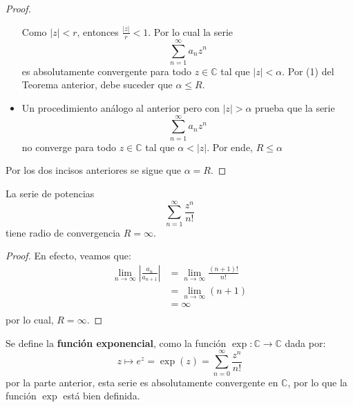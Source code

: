 \documentclass[12pt]{report}
\theoremstyle{largebreak}
\newcommand\abs[1]{\ensuremath{\left|#1\right|}}
\newcommand\cf[3]{\ensuremath{#1:#2\rightarrow#3}}
\begin{document}
\begin{proof}
\begin{itemize}
\begin{equation*}
            \end{equation*}
            Como $\abs{z}<r$, entonces $\frac{\abs{z}}{r}<1$. Por lo cual la serie
            \begin{equation*}
                \sum_{ n=1}^\infty a_nz^n
            \end{equation*}
            es absolutamente convergente para todo $z\in\mathbb{C}$ tal que $\abs{z}<\alpha$. Por (1) del Teorema anterior, debe suceder que $\alpha\leq R$.
            \item Un procedimiento análogo al anterior pero con $\abs{z}>\alpha$ prueba que la serie
            \begin{equation*}
                \sum_{ n=1}^\infty a_nz^n
            \end{equation*}
            no converge para todo $z\in\mathbb{C}$ tal que $\alpha<\abs{z}$. Por ende, $R\leq \alpha$
        \end{itemize}
        Por los dos incisos anteriores se sigue que $\alpha=R$.
    \end{proof}

    \begin{exa}
        La serie de potencias
        \begin{equation*}
            \sum_{ n=1}^\infty\frac{z^n}{n!}
        \end{equation*}
        tiene radio de convergencia $R=\infty$.
    \end{exa}

    \begin{proof}
        En efecto, veamos que:
        \begin{equation*}
            \begin{split}
                \lim_{n\rightarrow\infty}\abs{\frac{a_{ n}}{a_{n+1}}}&=\lim_{n\rightarrow\infty}\frac{(n+1)!}{n!}\\
                &=\lim_{n\rightarrow\infty}(n+1)\\
                &=\infty\\
            \end{split}
        \end{equation*}
        por lo cual, $R=\infty$.
    \end{proof}

    \begin{mydef}
        Se define la \textbf{función exponencial}, como la función $\cf{\exp}{\mathbb{C}}{\mathbb{C}}$ dada por:
        \begin{equation*}
            z\mapsto e^z=\exp(z)=\sum_{ n=0}^\infty\frac{z^n}{n!}
        \end{equation*}
        por la parte anterior, esta serie es absolutamente convergente en $\mathbb{C}$, por lo que la función $\exp$ está bien definida.
    \end{mydef}
\end{document}
